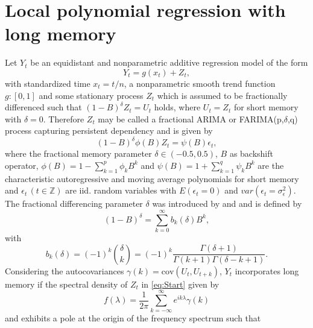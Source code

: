 \documentclass[12pt]{article}
\begin{document}
\section{Local polynomial regression with long memory}
Let \(Y_{t}\) be an equidistant and nonparametric additive regression model of the form
\begin{equation}
\label{eq:Start}
Y_{t} = g(x_{t}) + Z_{t},
\end{equation} 
with standardized time \(x_t = t/n\), a nonparametric smooth trend function \(g:[0,1]\) and some stationary process \(Z_t\) which is assumed to be fractionally differenced such that \((1-B)^{\delta}Z_t =U_t\) holds, where \(U_t = Z_t\) for short memory with \(\delta = 0\).
Therefore \(Z_t\) may be called a  fractional ARIMA or FARIMA(p,\(\delta\),q) process capturing persistent dependency and is given by 
\begin{equation}
\label{eq:FARIMA}
	(1-B)^{\delta}\phi(B) Z_{t} = \psi(B) \epsilon_{t}, 
\end{equation}
where the fractional memory parameter \( \delta \in (-0.5,0.5) \),
 \(B\) as backshift operator, \( \phi(B) = 1 - \sum_{k=1}^{p} \phi_{k} B^k \) and \( \psi(B) = 1 + \sum_{k=1}^{q} \psi_{k} B^k \) are the characteristic autoregressive and moving average polynomials for short memory and \( \epsilon_{t} \, (t \in \mathbb{Z}) \)  are iid. random variables with \(E(\epsilon_{t} = 0)\) and \(var(\epsilon_{t} = \sigma_{\epsilon}^{2})\).
The fractional differencing parameter \( \delta \) was introduced by \textcite{granger1980introduction} and \textcite{hosking1981fractional} and is defined by 
\begin{equation}
\label{eq:fractional difference 1}
(1-B)^{\delta} = \sum_{k=0}^{\infty} b_k(\delta) B^k, 
\end{equation} 
with
\begin{equation}
\label{eq:fractional difference 2}
b_k(\delta) = (-1)^{k}{\delta\choose k}  = (-1)^{k} \frac{\Gamma(\delta+1)}{\Gamma(k+1)\Gamma(\delta-k+1)}. 
\end{equation} 
Considering the autocovariances \(\gamma(k) = \text{cov}(U_t,U_{t+k})\), \(Y_t\) incorporates long memory if the spectral density of \(Z_t\) in \eqref{eq:Start} given by
\begin{equation}
\label{eq:long memory1}
f(\lambda) = \frac{1}{2 \pi} \sum_{k=-\infty}^{\infty} e^{i k \lambda} \gamma(k) 
\end{equation}
and exhibits a pole at the origin of the frequency spectrum such that
\end{document}

